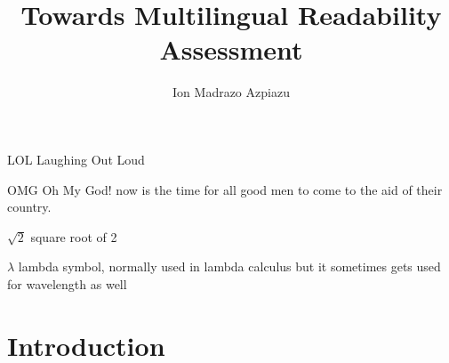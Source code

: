 \documentclass{bsu-ms}
\title{Towards Multilingual Readability Assessment}
\author{Ion Madrazo Azpiazu}
\begin{document}
\frontmatter  %

\buildFrontPages %

\begin{listAbbreviations}
  \item[LOL] Laughing Out Loud
  \item[OMG] Oh My God! now is the time for all good men to come to the
    aid of their country.
\end{listAbbreviations}


\begin{listSymbols}
  \item[$\sqrt{2}$] square root of 2
  \item[$\lambda$] lambda symbol, normally used in lambda calculus but
    it sometimes gets used for wavelength as well
\end{listSymbols}



\mainmatter


%
%

\chapter{Introduction}

\end{document}

